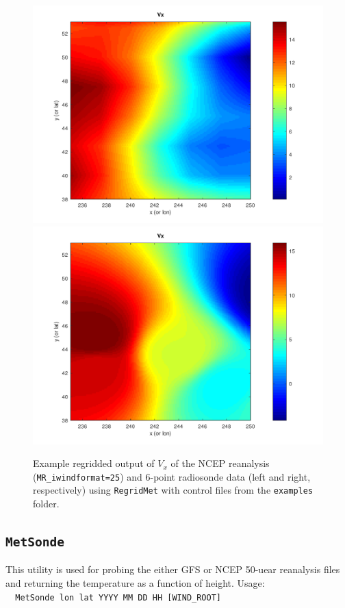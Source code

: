 \documentclass[11pt]{article}   %
\begin{document}
\begin{figure}[htbp]\begin{center}
 \includegraphics[angle=0,scale=0.35]{Figs/RegNCEP.pdf}
 \includegraphics[angle=0,scale=0.35]{Figs/RegSonde.pdf}
 \parbox{15cm}{\caption{\label{FigRegrid}
 Example regridded output of $V_x$ of the NCEP reanalysis (\texttt{MR\_iwindformat=25}) and
 6-point radiosonde data (left and right, respectively) using \texttt{RegridMet} with control files
 from the \texttt{examples} folder.
 }}
 \end{center}\end{figure}


\subsection{\texttt{MetSonde}}
This utility is used for probing the either GFS or NCEP 50-uear reanalysis files and
returning the temperature as a function of height.  
Usage:\\
\verb|  MetSonde lon lat YYYY MM DD HH [WIND_ROOT]|
\end{document}
